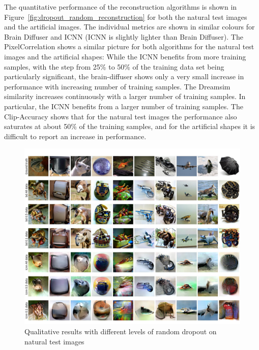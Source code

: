 The quantitative performance of the reconstruction algorithms is shown in Figure~\ref{fig:dropout_random_reconstruction} for both the natural test images and the artificial images. The individual metrics are shown in similar colours for Brain Diffuser and ICNN (ICNN is slightly lighter than Brain Diffuser). The PixelCorrelation shows a similar picture for both algorithms for the natural test images and the artificial shapes: While the ICNN benefits from more training samples, with the step from 25\% to 50\% of the training data set being particularly significant, the brain-diffuser shows only a very small increase in performance with increasing number of training samples. The Dreamsim similarity increases continuously with a larger number of training samples. In particular, the ICNN benefits from a larger number of training samples. The Clip-Accuracy shows that for the natural test images the performance also saturates at about 50\% of the training samples, and for the artificial shapes it is difficult to report an increase in performance.


\begin{figure}[ht]
    \centering
    \includegraphics[width=1\textwidth]{plots/dropout_qual_random_test.JPEG}
    \caption{Qualitative results with different levels of random dropout on natural test images}\label{fig:dropout_qual_random_test}
\end{figure}

